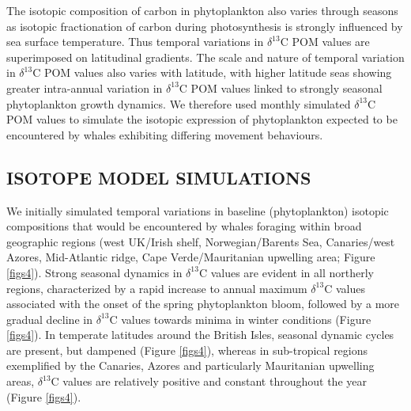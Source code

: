 \documentclass[a4paper,12pt]{article}
\begin{document}
The isotopic composition of carbon in phytoplankton also varies through seasons as isotopic fractionation of carbon during photosynthesis is strongly influenced by sea surface temperature\cite{laws1995dependence}. 
Thus temporal variations in $\delta^{13}$C POM values are superimposed on latitudinal gradients. 
The scale and nature of temporal variation in $\delta^{13}$C POM values also varies with latitude, with higher latitude seas showing greater intra-annual variation in $\delta^{13}$C POM values linked to strongly seasonal phytoplankton growth dynamics. 
We therefore used monthly simulated $\delta^{13}$C POM values to simulate the isotopic expression of phytoplankton expected to be encountered by whales exhibiting differing movement behaviours.
 
\subsection*{ISOTOPE MODEL SIMULATIONS}
We initially simulated temporal variations in baseline (phytoplankton) isotopic compositions that would be encountered by whales foraging within broad geographic regions (west UK/Irish shelf, Norwegian/Barents Sea, Canaries/west Azores, Mid-Atlantic ridge, Cape Verde/Mauritanian upwelling area; Figure \ref{figs4}). 
Strong seasonal dynamics in $\delta^{13}$C values are evident in all northerly regions, characterized by a rapid increase to annual maximum $\delta^{13}$C values associated with the onset of the spring phytoplankton bloom, followed by a more gradual decline in $\delta^{13}$C values towards minima in winter conditions (Figure \ref{figs4}). 
In temperate latitudes around the British Isles, seasonal dynamic cycles are present, but dampened (Figure \ref{figs4}), whereas in sub-tropical regions exemplified by the Canaries, Azores and particularly Mauritanian upwelling areas, $\delta^{13}$C values are relatively positive and constant throughout the year (Figure \ref{figs4}).
 
\end{document}

